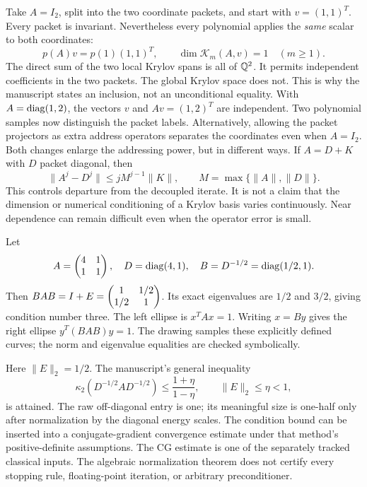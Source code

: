 Take $A=I_2$, split into the two coordinate packets, and start with $v=(1,1)^T$. Every packet is invariant. Nevertheless every polynomial applies the \emph{same} scalar to both coordinates:
\[
p(A)v=p(1)(1,1)^T,\qquad \dim\mathcal K_m(A,v)=1\quad(m\ge1).
\]
The direct sum of the two local Krylov spans is all of $\mathbb Q^2$. It permits independent coefficients in the two packets. The global Krylov space does not. This is why the manuscript states an inclusion, not an unconditional equality.
With $A=\operatorname{diag}(1,2)$, the vectors $v$ and $Av=(1,2)^T$ are independent. Two polynomial samples now distinguish the packet labels. Alternatively, allowing the packet projectors as extra address operators separates the coordinates even when $A=I_2$. Both changes enlarge the addressing power, but in different ways.
If $A=D+K$ with $D$ packet diagonal, then
\[
\|A^j-D^j\|\le jM^{j-1}\|K\|,
\qquad M=\max\{\|A\|,\|D\|\}.
\]
This controls departure from the decoupled iterate. It is not a claim that the dimension or numerical conditioning of a Krylov basis varies continuously. Near dependence can remain difficult even when the operator error is small.

Let
\[
A=\begin{pmatrix}4&1\\1&1\end{pmatrix},\quad D=\operatorname{diag}(4,1),\quad
B=D^{-1/2}=\operatorname{diag}(1/2,1).
\]
Then $BAB=I+E=\begin{pmatrix}1&1/2\\1/2&1\end{pmatrix}$. Its exact eigenvalues are $1/2$ and $3/2$, giving condition number three.
The left ellipse is $x^TAx=1$. Writing $x=By$ gives the right ellipse $y^T(BAB)y=1$. The drawing samples these explicitly defined curves; the norm and eigenvalue equalities are checked symbolically.

Here $\|E\|_2=1/2$. The manuscript's general inequality
\[
\kappa_2(D^{-1/2}AD^{-1/2})
\le\frac{1+\eta}{1-\eta},\qquad \|E\|_2\le\eta<1,
\]
is attained. The raw off-diagonal entry is one; its meaningful size is one-half only after normalization by the diagonal energy scales.
The condition bound can be inserted into a conjugate-gradient convergence estimate under that method's positive-definite assumptions. The CG estimate is one of the separately tracked classical inputs. The algebraic normalization theorem does not certify every stopping rule, floating-point iteration, or arbitrary preconditioner.


